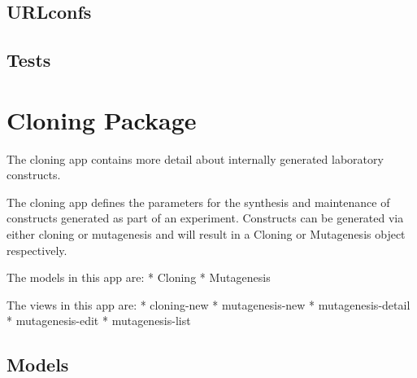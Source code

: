 \documentclass[letterpaper,10pt,english]{sphinxmanual}
\begin{document}
\subsection{URLconfs}
\label{api:id3}

\subsection{Tests}
\label{api:id4}

\section{Cloning Package}
\label{api:module-experimentdb.cloning}\label{api:cloning-package}
The cloning app contains more detail about internally generated laboratory constructs.

The cloning app defines the parameters for the synthesis and maintenance of constructs generated as part of an experiment.  Constructs can be generated via either cloning or mutagenesis and will result in a Cloning or Mutagenesis object respectively.

The models in this app are:
* Cloning
* Mutagenesis

The views in this app are:
* cloning-new
* mutagenesis-new
* mutagenesis-detail
* mutagenesis-edit
* mutagenesis-list


\subsection{Models}
\label{api:id5}\label{api:module-experimentdb.cloning.models}
\end{document}
